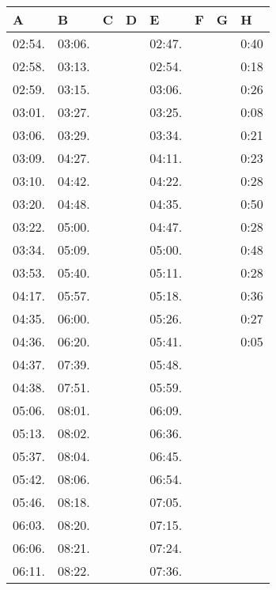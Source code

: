 \documentclass{mcmthesis}
\begin{document}
\begin{appendices}
\begin{table}[htbp]
\begin{tabular}{m{1.3cm}<{\centering}m{1.3cm}<{\centering}m{1.3cm}<{\centering}m{1.3cm}<{\centering}m{1.3cm}<{\centering}m{1.3cm}<{\centering}m{1.3cm}<{\centering}m{1.3cm}<{\centering}}
				\bottomrule
			\end{tabular}
		\end{table}
		\begin{table}[htbp]
			\centering
			\begin{tabular}{m{1.3cm}<{\centering}m{1.3cm}<{\centering}m{1.3cm}<{\centering}m{1.3cm}<{\centering}m{1.3cm}<{\centering}m{1.3cm}<{\centering}m{1.3cm}<{\centering}m{1.3cm}<{\centering}}
				\toprule
				\textbf{A}&\textbf{B}&\textbf{C}&\textbf{D}&\textbf{E}&\textbf{F}&\textbf{G}&\textbf{H}\\
				\midrule
				02:54.&	03:06.&		&		&	02:47.&		&		&	0:40\\
				02:58.&	03:13.&		&		&	02:54.&		&		&	0:18\\
				02:59.&	03:15.&		&		&	03:06.&		&		&	0:26\\
				03:01.&	03:27.&		&		&	03:25.&		&		&	0:08\\
				03:06.&	03:29.&		&		&	03:34.&		&		&	0:21\\
				03:09.&	04:27.&		&		&	04:11.&		&		&	0:23\\
				03:10.&	04:42.&		&		&	04:22.&		&		&	0:28\\
				03:20.&	04:48.&		&		&	04:35.&		&		&	0:50\\
				03:22.&	05:00.&		&		&	04:47.&		&		&	0:28\\
				03:34.&	05:09.&		&		&	05:00.&		&		&	0:48\\
				03:53.&	05:40.&		&		&	05:11.&		&		&	0:28\\
				04:17.&	05:57.&		&		&	05:18.&		&		&	0:36\\
				04:35.&	06:00.&		&		&	05:26.&		&		&	0:27\\
				04:36.&	06:20.&		&		&	05:41.&		&		&	0:05\\
				04:37.&	07:39.&		&		&	05:48.&&&\\		
				04:38.&	07:51.&		&		&	05:59.&&&\\			
				05:06.&	08:01.&		&		&	06:09.&&&\\			
				05:13.&	08:02.&		&		&	06:36.&&&\\			
				05:37.&	08:04.&		&		&	06:45.&&&\\			
				05:42.&	08:06.&		&		&	06:54.&&&\\		
				05:46.&	08:18.&		&		&	07:05.&&&\\			
				06:03.&	08:20.&		&		&	07:15.&&&\\			
				06:06.&	08:21.&		&		&	07:24.&&&\\			
				06:11.&	08:22.&		&		&	07:36.&&&\\			

\end{tabular}
\end{table}
\end{appendices}
\end{document}
